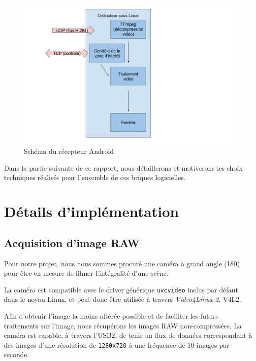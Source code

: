 \documentclass[11pt,a4paper]{article}
\begin{document}
\bigbreak
\begin{figure}[H]
\begin{center}
\includegraphics[scale=0.35]{images/schema_recepteur_linux.png}
\end{center}
\caption{Schéma du récepteur Android}
\label{}
\end{figure}

\bigbreak
Dans la partie suivante de ce rapport, nous détaillerons et motiverons les choix techniques réalisés pour l'ensemble de ces briques logicielles.

\section{Détails d'implémentation}

\subsection{Acquisition d'image RAW}
Pour notre projet, nous nous sommes procuré une caméra à grand angle (180\degree) pour être en mesure de filmer l'intégralité d'une scène.

\bigbreak
La caméra est compatible avec le driver générique \texttt{uvcvideo} inclus par défaut dans le noyau Linux, et peut donc être utilisée à travers \textit{Video4Linux 2}, V4L2.

\bigbreak
Afin d'obtenir l'image la moins altérée possible et de faciliter les futurs traitements sur l'image, nous récupérons les images RAW non-compressées.
La caméra est capable, à travers l'USB2, de tenir un flux de données correspondant à des images d'une résolution de \texttt{1280x720} à une fréquence de 10 images par seconde.
\end{document}
